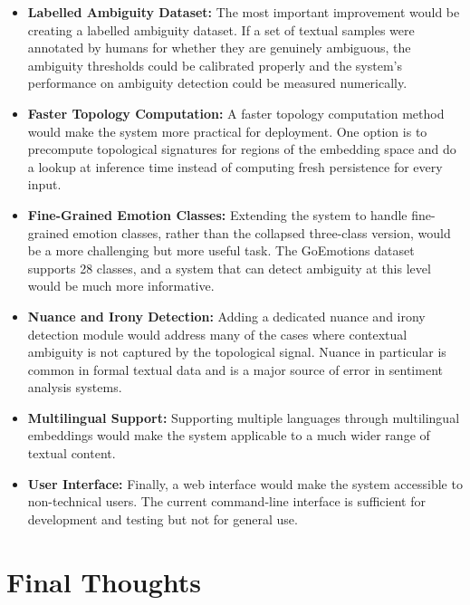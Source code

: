 \begin{itemize}
    \item \textbf{Labelled Ambiguity Dataset:} The most important improvement would be
    creating a labelled ambiguity dataset. If a set of textual samples were annotated by
    humans for whether they are genuinely ambiguous, the ambiguity thresholds could be
    calibrated properly and the system's performance on ambiguity detection could be
    measured numerically.

    \item \textbf{Faster Topology Computation:} A faster topology computation method would
    make the system more practical for deployment. One option is to precompute topological
    signatures for regions of the embedding space and do a lookup at inference time instead
    of computing fresh persistence for every input.

    \item \textbf{Fine-Grained Emotion Classes:} Extending the system to handle fine-grained
    emotion classes, rather than the collapsed three-class version, would be a more
    challenging but more useful task. The GoEmotions dataset supports 28 classes, and a
    system that can detect ambiguity at this level would be much more informative.

    \item \textbf{Nuance and Irony Detection:} Adding a dedicated nuance and irony
    detection module would address many of the cases where contextual ambiguity is not
    captured by the topological signal. Nuance in particular is common in formal textual data
    and is a major source of error in sentiment analysis systems.

    \item \textbf{Multilingual Support:} Supporting multiple languages through multilingual
    embeddings would make the system applicable to a much wider range of textual
    content.

    \item \textbf{User Interface:} Finally, a web interface would make the system accessible
    to non-technical users. The current command-line interface is sufficient for development
    and testing but not for general use.
\end{itemize}

\section{Final Thoughts}

